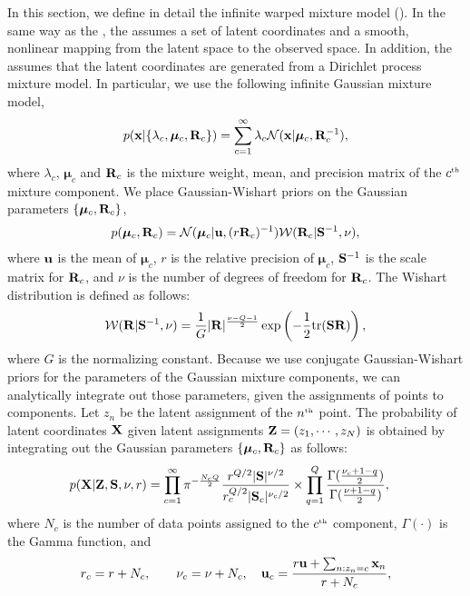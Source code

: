 In this section, we define in detail the infinite warped mixture model (\iwmm{}).
In the same way as the \gplvm{}, the \iwmm{} assumes a set of latent coordinates and a smooth, nonlinear mapping from the latent space to the observed space.
In addition, the \iwmm{} assumes that the latent coordinates
are generated from a Dirichlet process mixture model.
In particular, we use the following infinite Gaussian mixture model,
\begin{align}
p({\bf{x}}|\{\lambda_{c},\bm{\mu}_{c},\mathbf{R}_{c}\}) = \sum_{c=1}^{\infty} \lambda_{c} {\cal N}({\bf{x}}|\bm{\mu}_{c},\mathbf{R}_{c}^{-1}),
\end{align}
where $\lambda_{c}$, $\bm{\mu}_{c}$ and $\mathbf{R}_{c}$ is the mixture weight, 
mean, and precision matrix of the $c^{\text{\tiny th}}$ mixture component.
We place Gaussian-Wishart priors on the Gaussian parameters
$\{\bm{\mu}_{c},\mathbf{R}_{c}\}$,
\begin{align}
p(\bm{\mu}_{c},\mathbf{R}_{c})
= {\cal N}(\bm{\mu}_{c}|{\bf{u}},(r\mathbf{R}_{c})^{-1})
{\cal W}(\mathbf{R}_{c}|\mathbf{S}^{-1},\nu),
\end{align}
where ${\bf{u}}$ is the mean of $\bm{\mu}_{c}$, 
$r$ is the relative precision of $\bm{\mu}_{c}$, 
$\mathbf{S}^{-1}$ is the scale matrix for $\mathbf{R}_{c}$, 
and $\nu$ is the number of degrees of freedom for $\mathbf{R}_{c}$.
The Wishart distribution is defined as follows:
\begin{align}
{\cal W}(\mathbf{R}|\mathbf{S}^{-1},\nu)
=\frac{1}{G}|\mathbf{R}|^{\frac{\nu-Q-1}{2}}\exp\left(-\frac{1}{2}{\rm tr}(\mathbf{S}\mathbf{R})\right),
\end{align}
where $G$ is the normalizing constant.
Because we use conjugate Gaussian-Wishart priors for the parameters of the Gaussian mixture components, we can analytically integrate out those parameters, given the assignments of points to components.
Let $z_{n}$ be the latent assignment of the $n^{\text{\tiny th}}$ point.
The probability of latent coordinates $\mathbf{X}$ given latent assignments $\mathbf{Z}=(z_{1},\cdots,z_{N})$ is obtained by integrating out the Gaussian parameters $\{\bm{\mu}_{c},\mathbf{R}_{c}\}$ as follows:
\begin{align}
p(\mathbf{X}|\mathbf{Z},\mathbf{S},\nu,r) &= \prod_{c=1}^{\infty}
\pi^{-\frac{N_{c}Q}{2}}\frac{r^{Q/2}|\mathbf{S}|^{\nu/2}}{r_{c}^{Q/2}|\mathbf{S}_{c}|^{\nu_{c}/2}}
\times \prod_{q=1}^{Q}\frac{\Gamma(\frac{\nu_{c}+1-q}{2})}{\Gamma(\frac{\nu+1-q}{2})},
\label{eq:px_z}
\end{align}
where
$N_{c}$ is the number of data points assigned to the $c^{\text{\tiny th}}$ component,
$\Gamma(\cdot)$ is the Gamma function, and
%
\begin{align}
r_{c}=r+N_{c}, \hspace{2em}
\nu_{c}=\nu+N_{c}, 
\quad
{\bf{u}}_{c}=\frac{r{\bf{u}}+\sum_{n:z_{n}=c}{\bf{x}}_{n}}{r+N_{c}}, 
\nonumber
\end{align}
